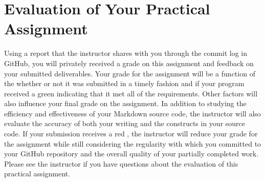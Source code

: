 \documentclass[11pt]{article}
\newcommand{\checkmark}{\ding{51}}
\newcommand{\naughtmark}{\ding{55}}
\begin{document}
\section*{Evaluation of Your Practical Assignment}

Using a report that the instructor shares with you through the commit log in GitHub, you will privately received a grade
on this assignment and feedback on your submitted deliverables. Your grade for the assignment will be a function of the
whether or not it was submitted in a timely fashion and if your program received a green \checkmark{} indicating that it
met all of the requirements. Other factors will also influence your final grade on the assignment. In addition to
studying the efficiency and effectiveness of your Markdown source code, the instructor will also evaluate the accuracy of
both your writing and the constructs in your source code. If your submission receives a red \naughtmark{}, the
instructor will reduce your grade for the assignment while still considering the regularity with which you committed to
your GitHub repository and the overall quality of your partially completed work. Please see the instructor if you have
questions about the evaluation of this practical assignment.


\end{document}
